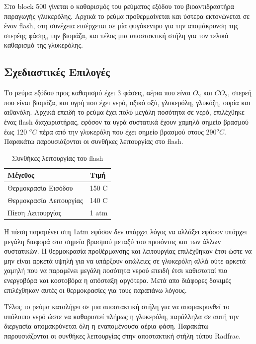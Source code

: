 \documentclass[11pt]{article}
\begin{document}
Στο block 500 γίνεται ο καθαρισμός του ρεύματος εξόδου του
βιοαντιδραστήρα παραγωγής γλυκερόλης. Αρχικά το ρεύμα προθερμαίνεται
και ύστερα εκτονώνεται σε έναν flash, στη συνέχεια εισέρχεται σε μία
φυγόκεντρο για την απομάκρυνση της στερέης φάσης, την βιομάζα, και τέλος
μια αποστακτική στήλη για τον τελικό καθαρισμό της γλυκερόλης.

\subsection{Σχεδιαστικές Επιλογές}
\label{sec:orgb580a96}
Το ρεύμα εξόδου προς καθαρισμό έχει 3 φάσεις, αέρια που είναι \(O_2\)
και \(CO_2\), στερεή που είναι βιομάζα, και υγρή που έχει νερό, οξικό
οξύ, γλυκερόλη, γλυκόζη, ουρία και αιθανόλη. Αρχικά επειδή το ρεύμα
έχει πολύ μεγάλη ποσότητα σε νερό, επιλέχθηκε ένας flash διαχωριστήρας,
εφόσον τα υγρά συστατικά έχουν χαμηλό σημείο βρασμού έως 120 \(^{o} C\)
πέρα από την γλυκερόλη που έχει σημείο βρασμού στους 290\(^{o} C\).
Παρακάτω παρουσιάζονται οι συνθήκες λειτουργίας στο flash.

\begin{table}[htbp]
\caption{Συνθήκες λειτουργίας του flash}
\centering
\begin{tabular}{ll}
Μέγεθος & Τιμή\\
\hline
Θερμοκρασία Εισόδου & 150 C\\
Θερμοκρασία Λειτουργίας & 140 C\\
Πίεση Λειτουργίας & 1 atm\\
\end{tabular}
\end{table}

Η πίεση παραμένει στη 1atm εφόσον δεν υπάρχει λόγος να αλλάξει εφόσον
υπάρχει μεγάλη διαφορά στα σημεία βρασμού μεταξύ του προιόντος και των
άλλων συστατικών. Η θερμοκρασία προθέρμανσης και λειτουργίας επιλέχθηκαν
έτσι ώστε να μην είναι αρκετά υψηλή για να υπάρξουν απώλειες σε
γλυκερόλη αλλά ούτε αρκετά χαμηλή που να παραμένει μεγάλη ποσότητα
νερού επειδή έτσι καθισταταί πιο ενεργοβόρα και κοστοβόρα η απόσταξη
αργότερα. Μετά απο διάφορες δοκιμές επιλέχθηκαν αυτές οι θερμοκρασίες
για τους παραπάνω λόγους.

Τέλος το ρεύμα καταλήγει σε μια αποστακτική στήλη για να απομακρυνθεί το
υπόλοιπο νερό ώστε να καθαριστεί πλήρως η γλυκερόλη, παράλληλα σε
αυτή την διεργασία απομακρύνεται όλη η εναπομένουσα αέρια φάση. Παρακάτω
παρουσιάζονται οι συνθήκες λειτουργίας στην αποστακτική στήλη τύπου
Radfrac.
\end{document}

